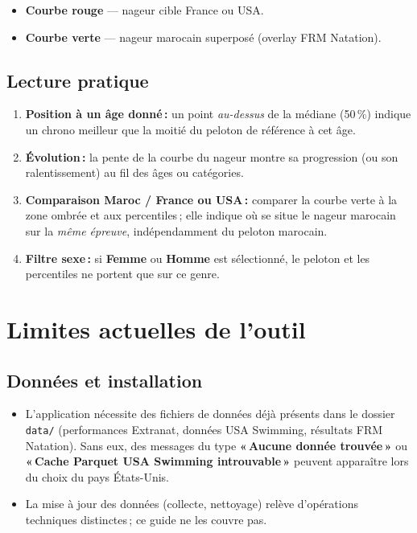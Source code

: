 \documentclass[11pt,a4paper]{article}
\begin{document}
\begin{itemize}
  \item \textbf{Courbe rouge} --- nageur cible France ou USA.
  \item \textbf{Courbe verte} --- nageur marocain superposé (overlay FRM Natation).
\end{itemize}

\subsection{Lecture pratique}

\begin{enumerate}
  \item \textbf{Position à un âge donné\,:} un point \emph{au-dessus} de la médiane (50\,\%) indique un chrono meilleur que la moitié du peloton de référence à cet âge.
  \item \textbf{Évolution\,:} la pente de la courbe du nageur montre sa progression (ou son ralentissement) au fil des âges ou catégories.
  \item \textbf{Comparaison Maroc / France ou USA\,:} comparer la courbe verte à la zone ombrée et aux percentiles\,; elle indique où se situe le nageur marocain sur la \emph{même épreuve}, indépendamment du peloton marocain.
  \item \textbf{Filtre sexe\,:} si \textbf{Femme} ou \textbf{Homme} est sélectionné, le peloton et les percentiles ne portent que sur ce genre.
\end{enumerate}

\section{Limites actuelles de l'outil}
\label{sec:limites}

\subsection{Données et installation}

\begin{itemize}
  \item L'application nécessite des fichiers de données déjà présents dans le dossier \texttt{data/} (performances Extranat, données USA Swimming, résultats FRM Natation). Sans eux, des messages du type \textbf{«\,Aucune donnée trouvée\,»} ou \textbf{«\,Cache Parquet USA Swimming introuvable\,»} peuvent apparaître lors du choix du pays États-Unis.
  \item La mise à jour des données (collecte, nettoyage) relève d'opérations techniques distinctes\,; ce guide ne les couvre pas.
\end{itemize}
\end{document}
